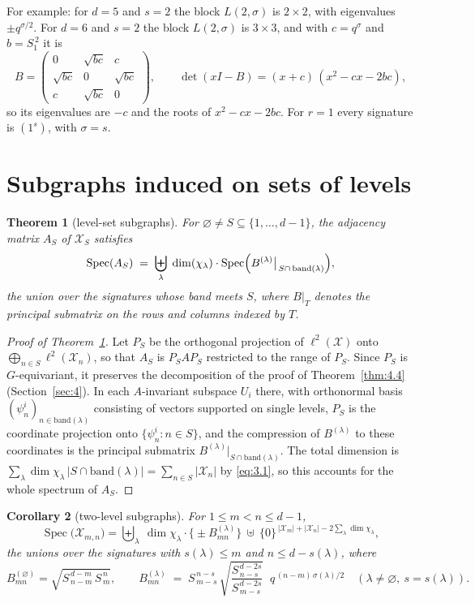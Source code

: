 \documentclass[11pt]{article}
\numberwithin{equation}{section}
\theoremstyle{plain}
\newtheorem{theorem}{Theorem}[section]
\newtheorem{corollary}[theorem]{Corollary}
\theoremstyle{definition}
\begin{document}
For example: for $d=5$ and $s=2$ the block $L(2,\sigma)$ is $2\times2$, with eigenvalues
$\pm q^{\sigma/2}$. For $d=6$ and $s=2$ the block $L(2,\sigma)$ is $3\times3$, and with
$c=q^{\sigma}$ and $b=S^{\,2}_1$ it is
\[
B=\begin{pmatrix}0&\sqrt{bc}&c\\ \sqrt{bc}&0&\sqrt{bc}\\ c&\sqrt{bc}&0\end{pmatrix},
\qquad
\det(xI-B)=(x+c)\,(x^2-cx-2bc),
\]
so its eigenvalues are $-c$ and the roots of $x^2-cx-2bc$. For $r=1$ every signature is $(1^s)$, with
$\sigma=s$.

\section{Subgraphs induced on sets of levels}\label{sec:7}

\begin{theorem}[level-set subgraphs]\label{thm:7.1}
For $\varnothing\ne S\subseteq\{1,\dots,d-1\}$,
the adjacency matrix $A_S$ of $\mathcal{X}_S$ satisfies
\[
\operatorname{Spec}(A_S)\;=\;\biguplus_{\lambda}\;\dim(\chi_\lambda)\cdot
\operatorname{Spec}\Bigl(B^{(\lambda)}\big|_{\,S\cap\,\mathrm{band}(\lambda)}\Bigr),
\]
the union over the signatures whose band meets $S$, where $B|_T$ denotes the
principal submatrix on the rows and columns indexed by $T$.
\end{theorem}

\begin{proof}[Proof of Theorem~\ref{thm:7.1}]
Let $P_S$ be the orthogonal projection of $\ell^2(\mathcal{X})$ onto
$\bigoplus_{n\in S}\ell^2(\mathcal{X}_n)$, so that $A_S$ is $P_SAP_S$ restricted to the range of
$P_S$. Since $P_S$ is $G$-equivariant, it preserves the decomposition of the proof of
Theorem~\ref{thm:4.4} (Section~\ref{sec:4}). In each $A$-invariant subspace $U_i$ there, with orthonormal
basis $(\psi^i_n)_{n\in\mathrm{band}(\lambda)}$ consisting of vectors supported on single
levels, $P_S$ is the coordinate projection onto $\{\psi^i_n:n\in S\}$, and the
compression of $B^{(\lambda)}$ to these coordinates is the principal submatrix
$B^{(\lambda)}|_{S\cap\mathrm{band}(\lambda)}$. The total dimension is
$\sum_\lambda\dim\chi_\lambda\,|S\cap\mathrm{band}(\lambda)|=\sum_{n\in S}|\mathcal{X}_n|$ by
\eqref{eq:3.1}, so this accounts for the whole spectrum of $A_S$.
\end{proof}

\begin{corollary}[two-level subgraphs]\label{thm:7.2}
For $1\le m<n\le d-1$,
\[
\operatorname{Spec}\bigl(\mathcal{X}_{m,n}\bigr)
=\biguplus_{\lambda}\ \dim\chi_\lambda\cdot\bigl\{\pm B^{(\lambda)}_{mn}\bigr\}
\ \uplus\ \{0\}^{\,|\mathcal{X}_m|+|\mathcal{X}_n|-2\sum_\lambda\dim\chi_\lambda},
\]
the unions over the signatures with $s(\lambda)\le m$ and $n\le d-s(\lambda)$, where
\[
B^{(\varnothing)}_{mn}=\sqrt{S^{\,d-m}_{\,n-m}\,S^{\,n}_{\,m}},\qquad
B^{(\lambda)}_{mn}\;=\;S^{\,n-s}_{\,m-s}\,
\sqrt{\frac{S^{\,d-2s}_{\,n-s}}{S^{\,d-2s}_{\,m-s}}}\;\;
q^{\,(n-m)\,\sigma(\lambda)/2}\quad(\lambda\ne\varnothing,\ s=s(\lambda)).
\]
\end{corollary}
\end{document}
